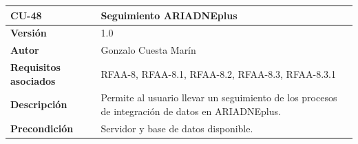 \documentclass[
]{article}
\begin{document}
\begin{longtable}[]{@{}ll@{}}
\toprule
\begin{minipage}[b]{0.20\columnwidth}\raggedright
\textbf{CU-48}\strut
\end{minipage} & \begin{minipage}[b]{0.74\columnwidth}\raggedright
\textbf{Seguimiento ARIADNEplus}\strut
\end{minipage}\tabularnewline
\midrule
\endhead
\begin{minipage}[t]{0.20\columnwidth}\raggedright
\textbf{Versión}\strut
\end{minipage} & \begin{minipage}[t]{0.74\columnwidth}\raggedright
1.0\strut
\end{minipage}\tabularnewline
\begin{minipage}[t]{0.20\columnwidth}\raggedright
\textbf{Autor}\strut
\end{minipage} & \begin{minipage}[t]{0.74\columnwidth}\raggedright
Gonzalo Cuesta Marín\strut
\end{minipage}\tabularnewline
\begin{minipage}[t]{0.20\columnwidth}\raggedright
\textbf{Requisitos asociados}\strut
\end{minipage} & \begin{minipage}[t]{0.74\columnwidth}\raggedright
RFAA-8, RFAA-8.1, RFAA-8.2, RFAA-8.3, RFAA-8.3.1\strut
\end{minipage}\tabularnewline
\begin{minipage}[t]{0.20\columnwidth}\raggedright
\textbf{Descripción}\strut
\end{minipage} & \begin{minipage}[t]{0.74\columnwidth}\raggedright
Permite al usuario llevar un seguimiento de los procesos de integración
de datos en ARIADNEplus.\strut
\end{minipage}\tabularnewline
\begin{minipage}[t]{0.20\columnwidth}\raggedright
\textbf{Precondición}\strut
\end{minipage} & \begin{minipage}[t]{0.74\columnwidth}\raggedright
Servidor y base de datos disponible.


\end{minipage}
\end{longtable}
\end{document}
